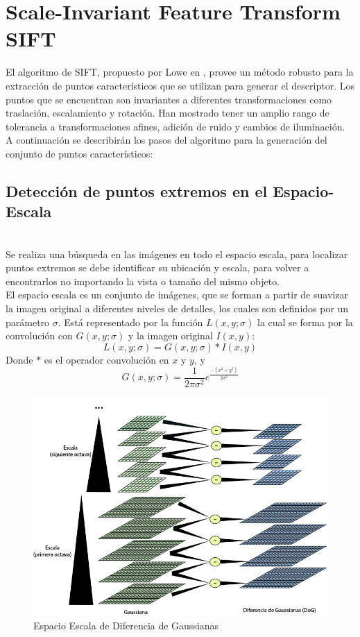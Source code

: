 \chapter{Scale-Invariant Feature Transform SIFT}
	El algoritmo de SIFT, propuesto por Lowe en \cite{Lowe2004},  provee un método robusto para la extracción de puntos característicos que se utilizan para generar el descriptor. Los puntos que se encuentran son invariantes a diferentes transformaciones como traslación, escalamiento y rotación. Han mostrado tener un amplio rango de tolerancia a transformaciones afines, adición de ruido y cambios de iluminación. A continuación se describirán los pasos del algoritmo para la generación del conjunto de puntos característicos:

	\section{Detección de puntos extremos en el Espacio-Escala} \hfill \\
		Se realiza una búsqueda en las imágenes en todo el espacio escala, para localizar puntos extremos se debe identificar su ubicación y escala, para volver a encontrarlos no importando la vista o tamaño del mismo objeto.\\
		El espacio escala es un conjunto de imágenes, que se forman a partir de suavizar la imagen original a diferentes niveles de detalles, los cuales son definidos por un parámetro $\sigma$. Está representado por la función $L(x,y;\sigma)$ la cual se forma por la convolución con $G(x,y;\sigma)$ y la imagen original $I(x,y)$:
		$$L(x,y;\sigma) = G(x,y;\sigma) * I(x,y)$$
		Donde $*$ es el operador convolución en $x$ y $y$, y
		$$ G(x,y;\sigma) = \frac{1}{2\pi\sigma^2}e^{\frac{-(x^2+y^2)}{2\sigma^2}}$$
		\begin{figure}[h]
			\centering
				\includegraphics[scale=0.5]{img/spaceScale.jpg}
			\caption{Espacio Escala de Diferencia de Gaussianas}
		\end{figure}		
